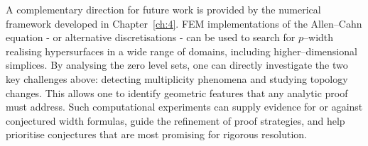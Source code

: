 \noindent A complementary direction for future work is provided by the numerical framework developed in Chapter~\ref{ch:4}. FEM implementations of the Allen–Cahn equation - or alternative discretisations - can be used to search for $p$--width realising hypersurfaces in a wide range of domains, including higher–dimensional simplices. By analysing the zero level sets, one can directly investigate the two key challenges above: detecting multiplicity phenomena and studying topology changes. This allows one to identify geometric features that any analytic proof must address. Such computational experiments can supply evidence for or against conjectured width formulas, guide the refinement of proof strategies, and help prioritise conjectures that are most promising for rigorous resolution.


